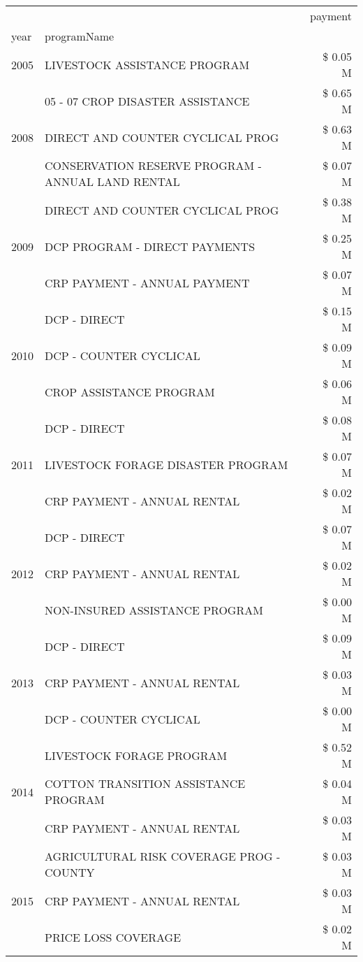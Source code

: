 \begin{tabular}{llr}
\toprule
 &  & payment \\
year & programName &  \\
\midrule
2005 & LIVESTOCK ASSISTANCE PROGRAM & \$ 0.05 M \\
\cline{1-3}
\multirow[t]{3}{*}{2008} & 05 - 07 CROP DISASTER ASSISTANCE & \$ 0.65 M \\
 & DIRECT AND COUNTER CYCLICAL PROG & \$ 0.63 M \\
 & CONSERVATION RESERVE PROGRAM - ANNUAL LAND RENTAL & \$ 0.07 M \\
\cline{1-3}
\multirow[t]{3}{*}{2009} & DIRECT AND COUNTER CYCLICAL PROG & \$ 0.38 M \\
 & DCP PROGRAM - DIRECT PAYMENTS & \$ 0.25 M \\
 & CRP PAYMENT - ANNUAL PAYMENT & \$ 0.07 M \\
\cline{1-3}
\multirow[t]{3}{*}{2010} & DCP - DIRECT & \$ 0.15 M \\
 & DCP - COUNTER CYCLICAL & \$ 0.09 M \\
 & CROP ASSISTANCE PROGRAM & \$ 0.06 M \\
\cline{1-3}
\multirow[t]{3}{*}{2011} & DCP - DIRECT & \$ 0.08 M \\
 & LIVESTOCK FORAGE DISASTER PROGRAM & \$ 0.07 M \\
 & CRP PAYMENT - ANNUAL RENTAL & \$ 0.02 M \\
\cline{1-3}
\multirow[t]{3}{*}{2012} & DCP - DIRECT & \$ 0.07 M \\
 & CRP PAYMENT - ANNUAL RENTAL & \$ 0.02 M \\
 & NON-INSURED ASSISTANCE PROGRAM & \$ 0.00 M \\
\cline{1-3}
\multirow[t]{3}{*}{2013} & DCP - DIRECT & \$ 0.09 M \\
 & CRP PAYMENT - ANNUAL RENTAL & \$ 0.03 M \\
 & DCP - COUNTER CYCLICAL & \$ 0.00 M \\
\cline{1-3}
\multirow[t]{3}{*}{2014} & LIVESTOCK FORAGE PROGRAM & \$ 0.52 M \\
 & COTTON TRANSITION ASSISTANCE PROGRAM & \$ 0.04 M \\
 & CRP PAYMENT - ANNUAL RENTAL & \$ 0.03 M \\
\cline{1-3}
\multirow[t]{3}{*}{2015} & AGRICULTURAL RISK COVERAGE PROG - COUNTY & \$ 0.03 M \\
 & CRP PAYMENT - ANNUAL RENTAL & \$ 0.03 M \\
 & PRICE LOSS COVERAGE & \$ 0.02 M \\

\end{tabular}
